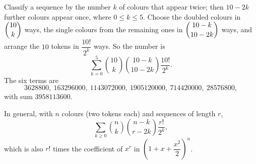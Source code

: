 Classify a sequence by the number $k$ of colours that appear twice; then $10-2k$ further colours appear once, where $0\le k\le5$. Choose the doubled colours in $\dbinom{10}{k}$ ways, the single colours from the remaining ones in $\dbinom{10-k}{10-2k}$ ways, and arrange the $10$ tokens in $\dfrac{10!}{2^k}$ ways. So the number is
\[\sum_{k=0}^{5}\binom{10}{k}\binom{10-k}{10-2k}\dfrac{10!}{2^k}.\]
The six terms are
\[3628800,\ 163296000,\ 1143072000,\ 1905120000,\ 714420000,\ 28576800,\]
with sum $\boxed{3958113600}$.

In general, with $n$ colours (two tokens each) and sequences of length $r$,
\[\sum_{k\ge0}\binom nk\binom{n-k}{r-2k}\dfrac{r!}{2^k},\]
which is also $r!$ times the coefficient of $x^r$ in $\left(1+x+\dfrac{x^2}{2}\right)^n$.
